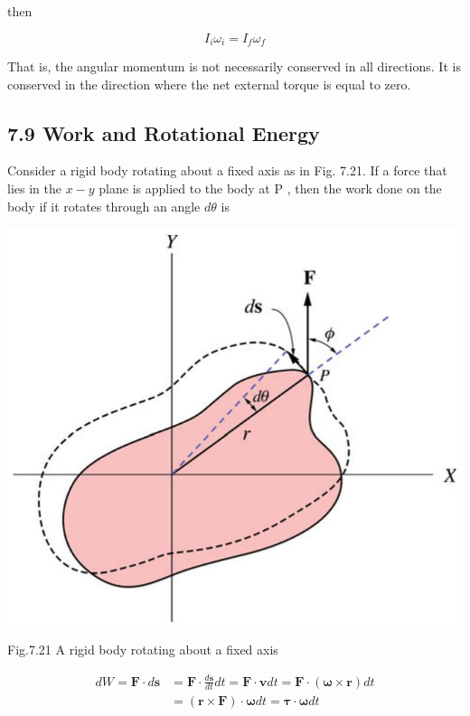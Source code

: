 \documentclass[10pt]{article}
\begin{document}
then

$$
I_{i} \omega_{i}=I_{f} \omega_{f}
$$

That is, the angular momentum is not necessarily conserved in all directions. It is conserved in the direction where the net external torque is equal to zero.

\subsection*{7.9 Work and Rotational Energy}
Consider a rigid body rotating about a fixed axis as in Fig. 7.21. If a force that lies in the $x-y$ plane is applied to the body at P , then the work done on the body if it rotates through an angle $d \theta$ is

\begin{center}
\includegraphics[max width=\textwidth]{2024_09_13_db1f357d2aad0a03eb2eg-122}
\end{center}

Fig.7.21 A rigid body rotating about a fixed axis

$$
\begin{aligned}
d W=\mathbf{F} \cdot d \mathbf{s} & =\mathbf{F} \cdot \frac{d \mathbf{s}}{d t} d t=\mathbf{F} \cdot \mathbf{v} d t=\mathbf{F} \cdot(\boldsymbol{\omega} \times \mathbf{r}) d t \\
& =(\mathbf{r} \times \mathbf{F}) \cdot \boldsymbol{\omega} d t=\boldsymbol{\tau} \cdot \boldsymbol{\omega} d t
\end{aligned}
$$
\end{document}
